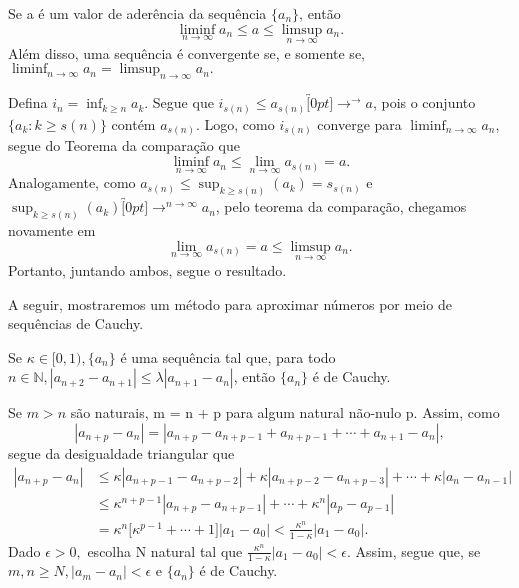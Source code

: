 \documentclass[analysis_notes.tex]{subfiles}
\begin{document}
\begin{theorem*}
	Se a \'e um valor de ader\^encia da sequ\^encia $\{a_{n}\} $, ent\~ao
	$$
		\liminf_{n\to\infty}a_{n}\leq{a}\leq{\limsup_{n\to\infty}a_{n}}.
	$$
	Al\'em disso, uma sequ\^encia \'e convergente se, e somente se, $\liminf_{n\to\infty}a_{n} = \limsup_{n\to\infty}a_{n}.$
\end{theorem*}
\begin{proof*}
	Defina $i_{n} = \inf_{k\geq{n}}a_{k}$. Segue que $i_{s(n)}\leq{a_{s(n)}}\overbracket[0pt]{\longrightarrow}^{\to }a$, pois o conjunto
	$\{a_{k}: k\geq{s(n)}\}$ cont\'em $a_{s(n)}$. Logo, como $i_{s(n)}$ converge para $\liminf_{n\to\infty}a_{n}$, segue do Teorema da compara\c c\~ao que
	$$
		\liminf_{n\to\infty}a_{n} \leq{\lim_{n\to\infty}a_{s(n)} = a}.
	$$
	Analogamente, como $a_{s(n)}\leq{\sup_{k\geq{s(n)}}{(a_{k})}} = s_{s(n)}$ e $\sup_{k\geq{s(n)}}{(a_{k})}\overbracket[0pt]{\longrightarrow}^{n\to\infty}a_{n}$,
	pelo teorema da compara\c c\~ao, chegamos novamente em
	$$
		\lim_{n\to\infty}a_{s(n)} = a \leq{\limsup_{n\to\infty}a_{n}}.
	$$
	Portanto, juntando ambos, segue o resultado. \qedsymbol
\end{proof*}
A seguir, mostraremos um m\'etodo para aproximar n\'umeros por meio de sequ\^encias de Cauchy.
\begin{theorem*}
	Se $\kappa\in{[0, 1)},\{a_{n}\} $ \'e uma sequ\^encia tal que, para todo $n\in \mathbb{N}, |a_{n+2}-a_{n+1}|\leq{\lambda|a_{n+1}-a_{n}|}$,
	ent\~ao $\{a_{n}\} $ \'e de Cauchy.
\end{theorem*}
\begin{proof*}
	Se $m > n$ s\~ao naturais, m = n + p para algum natural n\~ao-nulo p. Assim, como
	$$
		|a_{n+p} - a_{n}| = |a_{n+p} - a_{n+p-1} + a_{n+p-1}+\cdots + a_{n+1} - a_{n}|,
	$$
	segue da desigualdade triangular que
	\begin{align*}
		|a_{n+p}-a_{n}| & \leq{\kappa|a_{n+p-1}-a_{n+p-2}|+\kappa|a_{n+p-2}-a_{n+p-3}|+\cdots+\kappa|a_{n}-a_{n-1}|}                \\
		                & \leq{\kappa^{n+p-1}|a_{n+p} - a_{n+p-1}|}+\cdots+{\kappa^{n}|a_{p}-a_{p-1}|}                              \\
		                & ={\kappa^{n}\biggl[\kappa^{p-1}+\cdots+1\biggr]}|a_{1}-a_{0}| < \frac{\kappa^{n}}{1-\kappa}|a_{1}-a_{0}|.
	\end{align*}
	Dado $\epsilon > 0,$ escolha N natural tal que $\displaystyle \frac{\kappa^{n}}{1-\kappa}|a_{1}-a_{0}| < \epsilon.$ Assim, segue que,
	se $m, n\geq{N}, |a_{m}-a_{n}|<\epsilon$ e $\{a_{n}\} $ \'e de Cauchy. \qedsymbol
\end{proof*}
\end{document}
